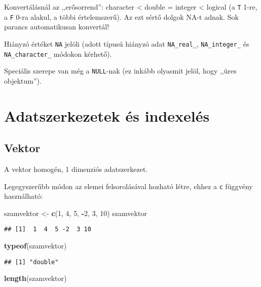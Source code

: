 \documentclass[]{book}
\newenvironment{Shaded}{\begin{snugshade}}{\end{snugshade}}
\newcommand{\KeywordTok}[1]{\textcolor[rgb]{0.13,0.29,0.53}{\textbf{#1}}}
\newcommand{\DecValTok}[1]{\textcolor[rgb]{0.00,0.00,0.81}{#1}}
\newcommand{\StringTok}[1]{\textcolor[rgb]{0.31,0.60,0.02}{#1}}
\newcommand{\OperatorTok}[1]{\textcolor[rgb]{0.81,0.36,0.00}{\textbf{#1}}}
\newcommand{\NormalTok}[1]{#1}
\begin{document}
Konvertálásnál az ,,erősorrend'': character \textless{} double = integer
\textless{} logical (a \texttt{T} 1-re, a \texttt{F} 0-ra alakul, a
többi értelemszerű). Az ezt sértő dolgok NA-t adnak. Sok parancs
automatikusan konvertál!

Hiányzó értéket \texttt{NA} jelöli (adott típusú hiányzó adat
\texttt{NA\_real\_}, \texttt{NA\_integer\_} és \texttt{NA\_character\_}
módokon kérhető).

Speciális szerepe van még a \texttt{NULL}-nak (ez inkább olyasmit jelöl,
hogy ,,üres objektum'').

\section{Adatszerkezetek és
indexelés}\label{adatszerkezetek-es-indexeles}

\subsection{Vektor}\label{vektor}

A vektor homogén, 1 dimenziós adatszerkezet.

Legegyszerűbb módon az elemei felsorolásával hozható létre, ehhez a
\texttt{c} függvény használható:

\begin{Shaded}
\begin{Highlighting}[]
\NormalTok{szamvektor <-}\StringTok{ }\KeywordTok{c}\NormalTok{(}\DecValTok{1}\NormalTok{, }\DecValTok{4}\NormalTok{, }\DecValTok{5}\NormalTok{, }\OperatorTok{-}\DecValTok{2}\NormalTok{, }\DecValTok{3}\NormalTok{, }\DecValTok{10}\NormalTok{)}
\NormalTok{szamvektor}
\end{Highlighting}
\end{Shaded}

\begin{verbatim}
## [1]  1  4  5 -2  3 10
\end{verbatim}

\begin{Shaded}
\begin{Highlighting}[]
\KeywordTok{typeof}\NormalTok{(szamvektor)}
\end{Highlighting}
\end{Shaded}

\begin{verbatim}
## [1] "double"
\end{verbatim}

\begin{Shaded}
\begin{Highlighting}[]
\KeywordTok{length}\NormalTok{(szamvektor)}
\end{Highlighting}
\end{Shaded}
\end{document}
